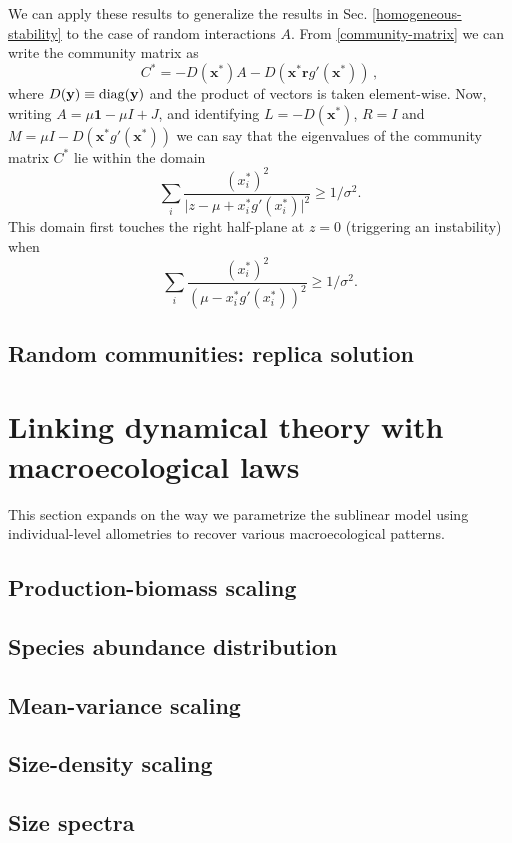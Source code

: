 \documentclass[12pt]{article}
\begin{document}
We can apply these results to generalize the results in Sec. \eqref{homogeneous-stability} to the case of random interactions $A$. From \eqref{community-matrix} we can write the community matrix as
\begin{equation}
    C^* = -D(\mathbf x^*)A - D(\mathbf x^* \mathbf r  g'( \mathbf x^*)) \, ,
\end{equation}
where $D(\bf{y})\equiv\textrm{diag}(\bf{y})$ and the product of vectors is taken element-wise. Now, writing $A = \mu \mathbf{1} - \mu I + J$, and identifying 
$L = -D(\mathbf x^*)$, $R = I$ and $M = \mu I -  D(\mathbf x^*g'(\mathbf x^*))$
we can say that the eigenvalues of the community matrix $C^*$ lie within the domain 
\begin{equation}
\sum_{i} \frac{(x_i^*)^2}{\vert z -\mu + x_i^*g'(x_i^*)\vert ^2}\geq 1/\sigma^2. 
\end{equation} 
This domain first touches the right half-plane at $z = 0$ (triggering an instability) when
\begin{equation}
    \sum_{i} \frac{(x_i^*)^2}{(\mu - x_i^*g'(x_i^*)) ^2}\geq 1/\sigma^2. 
\end{equation}

\subsection{Random communities: replica solution}

\section{Linking dynamical theory with macroecological laws}
This section expands on the way we parametrize the sublinear model using individual-level allometries to recover various macroecological patterns. 

\subsection{Production-biomass scaling}
\subsection{Species abundance distribution}
\subsection{Mean-variance scaling}
\subsection{Size-density scaling}
\subsection{Size spectra}

\printbibliography
\end{document}
